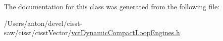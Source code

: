 The documentation for this class was generated from the following file\+:\begin{DoxyCompactItemize}
\item 
/\+Users/anton/devel/cisst-\/saw/cisst/cisst\+Vector/\hyperlink{vct_dynamic_compact_loop_engines_8h}{vct\+Dynamic\+Compact\+Loop\+Engines.\+h}\end{DoxyCompactItemize}
